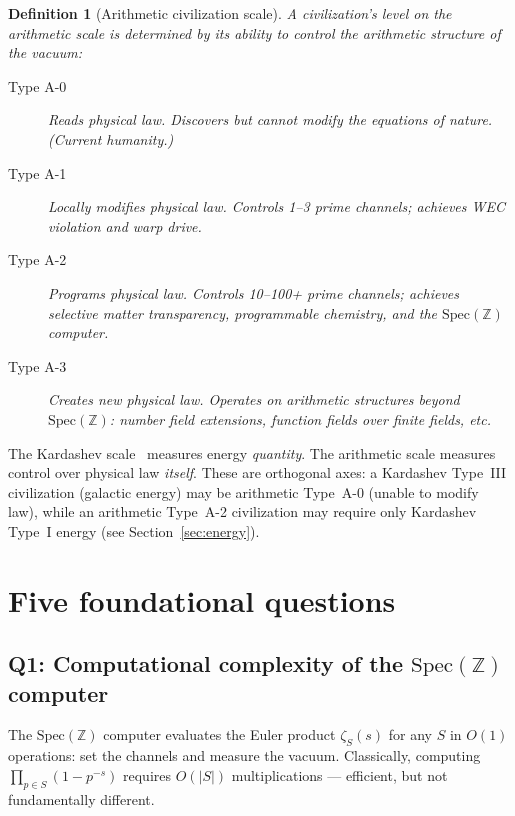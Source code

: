 \documentclass[11pt,a4paper]{article}
\newtheorem{definition}[theorem]{Definition}
\newcommand{\Spec}{\mathrm{Spec}}
\begin{document}
\begin{definition}[Arithmetic civilization scale]
\label{def:scale}
A civilization's level on the arithmetic scale is determined by
its ability to control the arithmetic structure of the vacuum:
\begin{description}
\item[Type A-0] \emph{Reads} physical law. Discovers but cannot
  modify the equations of nature. (Current humanity.)
\item[Type A-1] \emph{Locally modifies} physical law. Controls
  1--3 prime channels; achieves WEC violation and warp drive.
\item[Type A-2] \emph{Programs} physical law. Controls 10--100+
  prime channels; achieves selective matter transparency,
  programmable chemistry, and the $\Spec(\mathbb{Z})$ computer.
\item[Type A-3] \emph{Creates} new physical law. Operates on
  arithmetic structures beyond $\Spec(\mathbb{Z})$: number field
  extensions, function fields over finite fields, etc.
\end{description}
\end{definition}

The Kardashev scale~\cite{Kardashev1964} measures energy
\emph{quantity}. The arithmetic scale measures control over
physical law \emph{itself}. These are orthogonal axes: a
Kardashev Type~III civilization (galactic energy) may be
arithmetic Type~A-0 (unable to modify law), while an
arithmetic Type~A-2 civilization may require only Kardashev
Type~I energy (see Section~\ref{sec:energy}).

\section{Five foundational questions}
\label{sec:questions}

\subsection{Q1: Computational complexity of the $\Spec(\mathbb{Z})$ computer}

The $\Spec(\mathbb{Z})$ computer evaluates the Euler product
$\zeta_S(s)$ for any $S$ in $O(1)$ operations: set the channels
and measure the vacuum. Classically, computing
$\prod_{p \in S} (1-p^{-s})$ requires $O(|S|)$ multiplications
--- efficient, but not fundamentally different.
\end{document}
